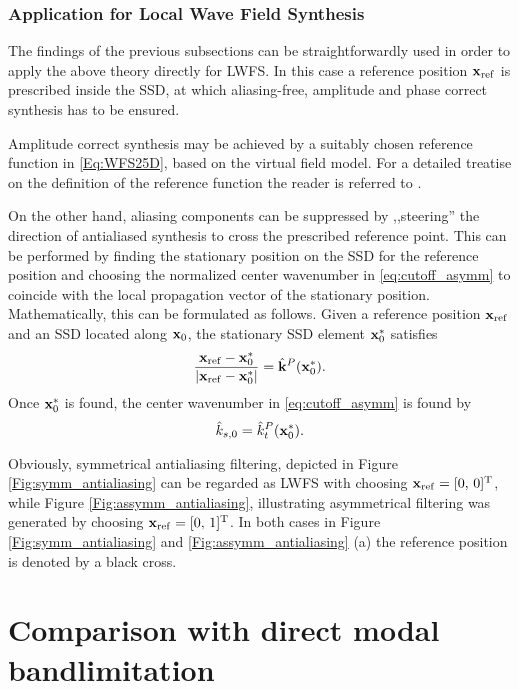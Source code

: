 \documentclass[conference]{IEEEtran}
\begin{document}
\subsubsection{Application for Local Wave Field Synthesis}
The findings of the previous subsections can be straightforwardly used in order to apply the above theory directly for LWFS.
In this case a reference position $\mathbf{x}_{\mathrm{ref}}$ is prescribed inside the SSD, at which aliasing-free, amplitude and phase correct synthesis has to be ensured.

Amplitude correct synthesis may be achieved by a suitably chosen reference function in \eqref{Eq:WFS25D}, based on the virtual field model.
For a detailed treatise on the definition of the reference function the reader is referred to \cite{Firtha2019phd}.

On the other hand, aliasing components can be suppressed by ,,steering'' the direction of antialiased synthesis to cross the prescribed reference point.
This can be performed by finding the stationary position on the SSD for the reference position and choosing the normalized center wavenumber in \eqref{eq:cutoff_asymm} to coincide with the local propagation vector of the stationary position.
Mathematically, this can be formulated as follows.
Given a reference position $\mathbf{x}_{\mathrm{ref}}$ and an SSD located along $\mathbf{x}_0$, the stationary SSD element $\mathbf{x}_0^*$ satisfies
\begin{equation}
    \frac{\mathbf{x}_{\mathrm{ref}} - \mathbf{x}_0^*}{\left| \mathbf{x}_{\mathrm{ref}} - \mathbf{x}_0^* \right|} = \hat{\mathbf{k}}^P(\mathbf{x}_0^*).
\end{equation}
Once $\mathbf{x}_0^*$ is found, the center wavenumber in \eqref{eq:cutoff_asymm} is found by
\begin{equation}
    \hat{k}_{s,0} = \hat{k}_t^P(\mathbf{x}_0^*).
\end{equation}

Obviously, symmetrical antialiasing filtering, depicted in Figure \ref{Fig:symm_antialiasing} can be regarded as LWFS with choosing $\mathbf{x}_{\mathrm{ref}} = [0, \, 0]^{\mathrm{T}}$,
while Figure \ref{Fig:assymm_antialiasing}, illustrating asymmetrical filtering was generated by choosing $\mathbf{x}_{\mathrm{ref}} = [0, \, 1]^{\mathrm{T}}$.
In both cases in Figure \ref{Fig:symm_antialiasing} and \ref{Fig:assymm_antialiasing} (a) the reference position is denoted by a black cross.

\section{Comparison with direct modal bandlimitation}
\label{sec:evaluation}
\end{document}
